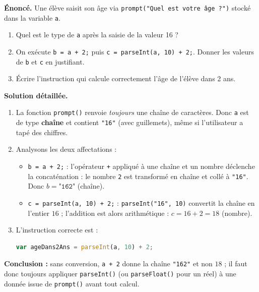 \documentclass[11pt]{article}
\newcommand{\cle}[1]{{\popxbold\color{popdark}#1}}
\begin{document}
\begin{exoresolu}
\textbf{Énoncé.} Une élève saisit son âge via \texttt{prompt("Quel est votre âge ?")} stocké dans la variable \texttt{a}.
\begin{enumerate}
  \item Quel est le type de \texttt{a} après la saisie de la valeur 16 ?
  \item On exécute \texttt{b = a + 2;} puis \texttt{c = parseInt(a, 10) + 2;}. Donner les valeurs de \texttt{b} et \texttt{c} en justifiant.
  \item Écrire l'instruction qui calcule correctement l'âge de l'élève dans 2 ans.
\end{enumerate}
\tcblower
\textbf{Solution détaillée.}
\begin{enumerate}
  \item La fonction \texttt{prompt()} renvoie \emph{toujours} une \cle{chaîne de caractères}. Donc \texttt{a} est de type \textbf{chaîne} et contient \texttt{"16"} (avec guillemets), même si l'utilisateur a tapé des chiffres.
  \item Analysons les deux affectations :
  \begin{itemize}
    \item \texttt{b = a + 2;} : l'opérateur \texttt{+} appliqué à une chaîne et un nombre déclenche la \cle{concaténation} : le nombre \texttt{2} est transformé en chaîne et collé à \texttt{"16"}. Donc $b = \texttt{"162"}$ (chaîne).
    \item \texttt{c = parseInt(a, 10) + 2;} : \texttt{parseInt("16", 10)} convertit la chaîne en l'entier $16$ ; l'addition est alors arithmétique : $c = 16 + 2 = 18$ (nombre).
  \end{itemize}
  \item L'instruction correcte est :
\begin{lstlisting}[language=JavaScript]
var ageDans2Ans = parseInt(a, 10) + 2;
\end{lstlisting}
\end{enumerate}
\textbf{Conclusion :} sans conversion, \texttt{a + 2} donne la chaîne \texttt{"162"} et non $18$ ; il faut donc toujours appliquer \texttt{parseInt()} (ou \texttt{parseFloat()} pour un réel) à une donnée issue de \texttt{prompt()} avant tout calcul.
\end{exoresolu}
\end{document}
